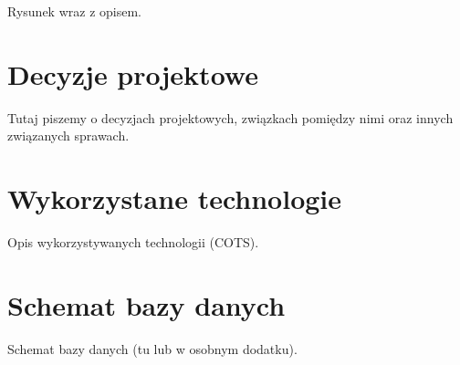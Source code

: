 {\color{red}Rysunek wraz z opisem.}

\section{Decyzje projektowe}
\label{Chapter55}

{\color{red}Tutaj piszemy o decyzjach projektowych, związkach pomiędzy nimi oraz innych związanych sprawach.}

\section{Wykorzystane technologie}
\label{Chapter56}

{\color{red}Opis wykorzystywanych technologii (COTS).}

\section{Schemat bazy danych}
\label{Chapter57}

{\color{red}Schemat bazy danych (tu lub w osobnym dodatku).}